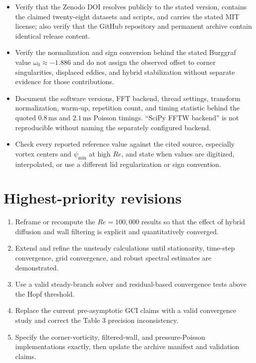 \documentclass[11pt]{article}
\newcommand{\Rey}{\mathit{Re}}
\begin{document}
\begin{itemize}
    \item Verify that the Zenodo DOI resolves publicly to the stated version, contains the claimed twenty-eight datasets and scripts, and carries the stated MIT license; also verify that the GitHub repository and permanent archive contain identical release content.
    \item Verify the normalization and sign conversion behind the stated Burggraf value $\omega_0\approx-1.886$ and do not assign the observed offset to corner singularities, displaced eddies, and hybrid stabilization without separate evidence for those contributions.
    \item Document the software versions, FFT backend, thread settings, transform normalization, warm-up, repetition count, and timing statistic behind the quoted $0.8\,\mathrm{ms}$ and $2.1\,\mathrm{ms}$ Poisson timings. ``SciPy FFTW backend'' is not reproducible without naming the separately configured backend.
    \item Check every reported reference value against the cited source, especially vortex centers and $\psi_{\min}$ at high $\Rey$, and state when values are digitized, interpolated, or use a different lid regularization or sign convention.
\end{itemize}

\section*{Highest-priority revisions}

\begin{enumerate}
    \item Reframe or recompute the $\Rey=100{,}000$ results so that the effect of hybrid diffusion and wall filtering is explicit and quantitatively converged.
    \item Extend and refine the unsteady calculations until stationarity, time-step convergence, grid convergence, and robust spectral estimates are demonstrated.
    \item Use a valid steady-branch solver and residual-based convergence tests above the Hopf threshold.
    \item Replace the current pre-asymptotic GCI claims with a valid convergence study and correct the Table 3 precision inconsistency.
    \item Specify the corner-vorticity, filtered-wall, and pressure-Poisson implementations exactly, then update the archive manifest and validation claims.
\end{enumerate}
\end{document}
